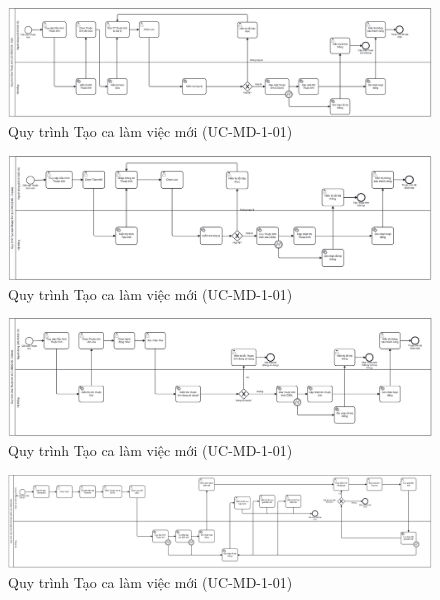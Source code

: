 \begin{figure}[H]
	\centering
	\includegraphics[width=15cm]{Sections/tong_quan/functional_spec/img/2.5.png}

     \vspace{0.5cm}
    \caption{Quy trình Tạo ca làm việc mới (UC-MD-1-01)}
\end{figure}
\begin{figure}[H]
	\centering
	\includegraphics[width=15cm]{Sections/tong_quan/functional_spec/img/2.5.1.png}

     \vspace{0.5cm}
    \caption{Quy trình Tạo ca làm việc mới (UC-MD-1-01)}
\end{figure}
\begin{figure}[H]
	\centering
	\includegraphics[width=15cm]{Sections/tong_quan/functional_spec/img/2.5.2.png}

     \vspace{0.5cm}
    \caption{Quy trình Tạo ca làm việc mới (UC-MD-1-01)}
\end{figure}

\begin{figure}[H]
	\centering
	\includegraphics[width=15cm]{Sections/tong_quan/functional_spec/img/2.6.png}

     \vspace{0.5cm}
    \caption{Quy trình Tạo ca làm việc mới (UC-MD-1-01)}
\end{figure}


